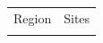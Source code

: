 \documentclass[journal abbreviation, manuscript]{copernicus}
\begin{document}
\begin{table}
 \scriptsize
 \begin{tabularx}{\textwidth}{lX}
  \tophline
  Region   & Sites                                                                                                                                                                                                                                                                                                                                                                                                                                                                                                                                                                                                                                                                                                                                                                                                                                                                                                                                                                                                                                                                                                                                                                                                                                                                                                                                                                                                                                                                                                                                                                                                                                                                                                                                                                                                                                                                                                                                                                                                           \\
  \middlehline

\end{tabularx}
\end{table}
\end{document}
